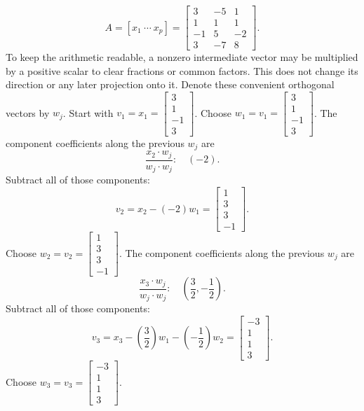\[A=[x_1\ \cdots\ x_p]=\left[\begin{array}{rrr}3&-5&1\\1&1&1\\-1&5&-2\\3&-7&8\end{array}\right].\]
To keep the arithmetic readable, a nonzero intermediate vector may be multiplied by a positive scalar to clear fractions or common factors. This does not change its direction or any later projection onto it. Denote these convenient orthogonal vectors by $w_j$.
Start with $v_1=x_1=\left[\begin{array}{r}3\\1\\-1\\3\end{array}\right]$.
Choose $w_{1}=v_{1}=\left[\begin{array}{r}3\\1\\-1\\3\end{array}\right]$.
The component coefficients along the previous $w_j$ are
\[\frac{x_{2}\cdot w_j}{w_j\cdot w_j}:\quad(-2).\]
Subtract all of those components:
\[v_{2}=x_{2}-(-2)w_{1}=\left[\begin{array}{r}1\\3\\3\\-1\end{array}\right].\]
Choose $w_{2}=v_{2}=\left[\begin{array}{r}1\\3\\3\\-1\end{array}\right]$.
The component coefficients along the previous $w_j$ are
\[\frac{x_{3}\cdot w_j}{w_j\cdot w_j}:\quad(\frac{3}{2},- \frac{1}{2}).\]
Subtract all of those components:
\[v_{3}=x_{3}-(\frac{3}{2})w_{1}-(- \frac{1}{2})w_{2}=\left[\begin{array}{r}-3\\1\\1\\3\end{array}\right].\]
Choose $w_{3}=v_{3}=\left[\begin{array}{r}-3\\1\\1\\3\end{array}\right]$.
